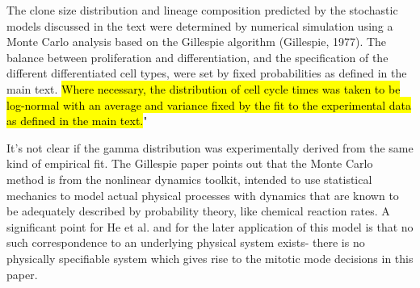 \bigskip

\begin{longquote}The clone size distribution and lineage composition predicted by the
stochastic models discussed in the text were determined by numerical
simulation using a Monte Carlo analysis based on the Gillespie algorithm
(Gillespie, 1977). The balance between proliferation and differentiation,
and the specification of the different differentiated cell types, were set by
fixed probabilities as defined in the main text.\hl{ Where necessary, the
distribution of cell cycle times was taken to be log-normal with an average
and variance fixed by the fit to the experimental data as defined in the main
text.}"
\end{longquote}

\bigskip

It's not clear if the gamma distribution was experimentally derived from the same kind of empirical fit. The Gillespie paper points out that the Monte Carlo method is from the nonlinear dynamics toolkit, intended to use statistical mechanics to model actual physical processes with dynamics that are known to be adequately described by probability theory, like chemical reaction rates. A significant point for He et al. and for the later application of this model is that no such correspondence to an underlying physical system exists- there is no physically specifiable system which gives rise to the mitotic mode decisions in this paper.

\bigskip


